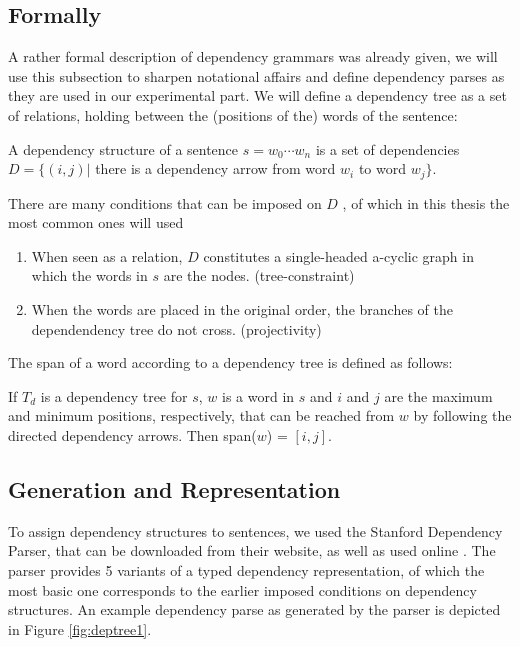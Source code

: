 \documentclass{report}
\begin{document}
\subsection{Formally}

A rather formal description of dependency grammars was already given, we will use this subsection to sharpen notational affairs and define dependency parses as they are used in our experimental part. We will define a dependency tree as a set of relations, holding between the (positions of the) words of the sentence:

\begin{definition}
A dependency structure of a sentence $s = w_0\cdots w_n$ is a set of dependencies $D = \{ (i,j) |$ there is a dependency arrow from word $w_i$ to word $w_j \}$. 
\end{definition}

There are many conditions that can be imposed on $D$ \citep{de2006generating}, of which in this thesis the most common ones will used\begin{enumerate}
\item When seen as a relation, $D$ constitutes a single-headed a-cyclic graph in which the words in $s$ are the nodes. (tree-constraint)
\item When the words are placed in the original order, the branches of the dependendency tree do not cross. (projectivity)
\end{enumerate}

The span of a word according to a dependency tree is defined as follows:

\begin{definition}
If $T_d$ is a dependency tree for $s$, $w$ is a word in $s$ and $i$ and $j$ are the maximum and minimum positions, respectively, that can be reached from $w$ by following the directed dependency arrows. Then span($w$) = $[i,j]$. 
\end{definition}

\subsection{Generation and Representation}

To assign dependency structures to sentences, we used the Stanford Dependency Parser, that can be downloaded from their website, as well as used online  \citep{de2006generating}. The parser provides 5 variants of a typed dependency representation, of which the most basic one corresponds to the earlier imposed conditions on dependency structures. An example dependency parse as generated by the parser is depicted in Figure \ref{fig:deptree1}.
\end{document}

